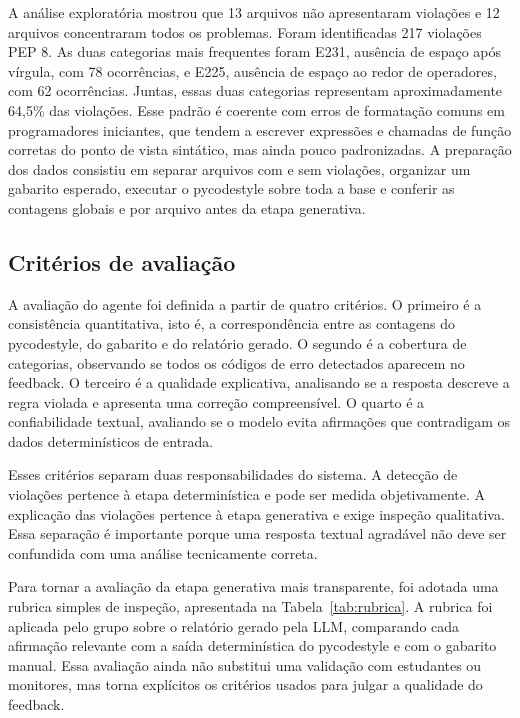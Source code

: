 \documentclass[12pt]{article}
\begin{document}
A análise exploratória mostrou que 13 arquivos não apresentaram violações e 12
arquivos concentraram todos os problemas. Foram identificadas 217 violações PEP
8. As duas categorias mais frequentes foram E231, ausência de espaço após
vírgula, com 78 ocorrências, e E225, ausência de espaço ao redor de operadores,
com 62 ocorrências. Juntas, essas duas categorias representam aproximadamente
64,5\% das violações. Esse padrão é coerente com erros de formatação comuns em
programadores iniciantes, que tendem a escrever expressões e chamadas de função
corretas do ponto de vista sintático, mas ainda pouco padronizadas. A
preparação dos dados consistiu em separar arquivos com e sem violações,
organizar um gabarito esperado, executar o pycodestyle sobre toda a base e
conferir as contagens globais e por arquivo antes da etapa generativa.

\subsection{Critérios de avaliação}

A avaliação do agente foi definida a partir de quatro critérios. O primeiro é a
consistência quantitativa, isto é, a correspondência entre as contagens do
pycodestyle, do gabarito e do relatório gerado. O segundo é a cobertura
de categorias, observando se todos os códigos de erro detectados aparecem no
feedback. O terceiro é a qualidade explicativa, analisando se a resposta
descreve a regra violada e apresenta uma correção compreensível. O quarto é a
confiabilidade textual, avaliando se o modelo evita afirmações que contradigam
os dados determinísticos de entrada.

Esses critérios separam duas responsabilidades do sistema. A detecção de
violações pertence à etapa determinística e pode ser medida objetivamente. A
explicação das violações pertence à etapa generativa e exige inspeção
qualitativa. Essa separação é importante porque uma resposta textual agradável
não deve ser confundida com uma análise tecnicamente correta.

Para tornar a avaliação da etapa generativa mais transparente, foi adotada uma
rubrica simples de inspeção, apresentada na Tabela~\ref{tab:rubrica}. A rubrica
foi aplicada pelo grupo sobre o relatório gerado pela LLM, comparando cada
afirmação relevante com a saída determinística do pycodestyle e com o gabarito
manual. Essa avaliação ainda não substitui uma validação com estudantes ou
monitores, mas torna explícitos os critérios usados para julgar a qualidade do
feedback.
\end{document}

